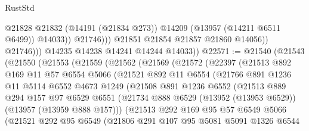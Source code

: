 \begin{lexlean}{RustStd}
\begin{coremodule}
                            @21828
                            @21832
                            (@14191 (@21834 @273))
                            @14209
                            (@13957 (@14211 @6511 @6499))
                            @14033))
                        @21746)))
                  @21851
                  @21854
                  @21857
                  @21860
                  @14056))
              @21746)))
        @14235
        @14238
        @14241
        @14244
        @14033))
@22571 := @21540
    (@21543
      (@21550
        (@21553
          (@21559
            (@21562
              (@21569
                (@21572
                  (@22397
                    (@21513
                      @892
                      @169
                      @11
                      @57
                      @6554
                      @5066
                      (@21521
                        @892
                        @11
                        @6554
                        (@21766
                          @891
                          @1236
                          @11
                          @5114
                          @6552
                          @4673
                          @1249
                          (@21508
                            @891
                            @1236
                            @6552
                            (@21513
                              @889
                              @294
                              @157
                              @97
                              @6529
                              @6551
                              (@21734
                                @888
                                @6529
                                (@13952 (@13953 @6529))
                                (@13957 (@13959 @888 @157)))
                              (@21513
                                @292
                                @169
                                @95
                                @57
                                @6549
                                @5066
                                (@21521
                                  @292
                                  @95
                                  @6549
                                  (@21806
                                    @291
                                    @107
                                    @95
                                    @5081
                                    @5091
                                    @1326
                                    @6544

\end{coremodule}
\end{lexlean}
